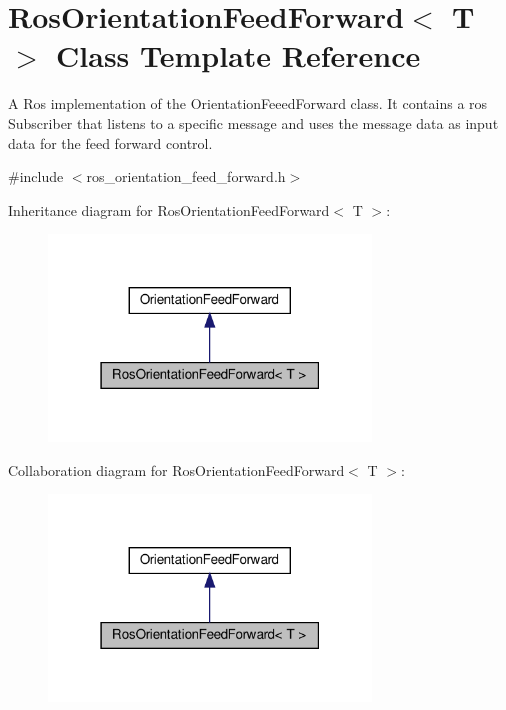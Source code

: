 \hypertarget{classRosOrientationFeedForward}{}\section{Ros\+Orientation\+Feed\+Forward$<$ T $>$ Class Template Reference}
\label{classRosOrientationFeedForward}


A Ros implementation of the Orientation\+Feeed\+Forward class. It contains a ros Subscriber that listens to a specific message and uses the message data as input data for the feed forward control.  




{\ttfamily \#include $<$ros\+\_\+orientation\+\_\+feed\+\_\+forward.\+h$>$}



Inheritance diagram for Ros\+Orientation\+Feed\+Forward$<$ T $>$\+:\nopagebreak
\begin{figure}[H]
\begin{center}
\leavevmode
\includegraphics[width=243pt]{d6/d61/classRosOrientationFeedForward__inherit__graph}
\end{center}
\end{figure}


Collaboration diagram for Ros\+Orientation\+Feed\+Forward$<$ T $>$\+:\nopagebreak
\begin{figure}[H]
\begin{center}
\leavevmode
\includegraphics[width=243pt]{df/d60/classRosOrientationFeedForward__coll__graph}
\end{center}
\end{figure}
